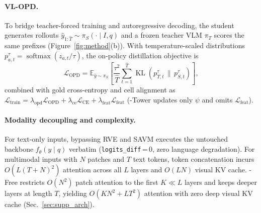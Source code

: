\paragraph{VL-OPD.}
To bridge teacher-forced training and autoregressive decoding, the student
generates rollouts $\hat{y}_{1:\hat{T}}\sim\pi_S(\cdot\mid I,q)$ and a frozen
teacher VLM $\pi_T$ scores the same prefixes (Figure~\ref{fig:method}(b)).
With temperature-scaled distributions $p_{a,t}^\tau=\operatorname{softmax}(z_{a,t}/\tau)$,
the on-policy distillation objective is
\begin{equation}
\mathcal{L}_{\mathrm{OPD}}=\mathbb{E}_{\hat{y}\sim\pi_S}\!\left[
\frac{\tau^2}{\hat{T}}\sum_{t=1}^{\hat{T}}
\operatorname{KL}\!\left(p_{T,t}^\tau\,\|\,p_{S,t}^\tau\right)\right],
\label{eq:opd}
\end{equation}
combined with gold cross-entropy and cell alignment as
$\mathcal{L}_{\mathrm{train}}=\lambda_{\mathrm{opd}}\mathcal{L}_{\mathrm{OPD}}+\lambda_{\mathrm{ce}}\mathcal{L}_{\mathrm{CE}}+\lambda_{\mathrm{feat}}\mathcal{L}_{\mathrm{feat}}$
(\modelname-Tower updates only $\psi$ and omits $\mathcal{L}_{\mathrm{feat}}$).

\paragraph{Modality decoupling and complexity.}
For text-only inputs, bypassing RVE and SAVM executes the untouched backbone
$f_\theta(y\mid q)$ verbatim (\texttt{logits\_diff}\,{=}\,$0$, zero language
degradation). For multimodal inputs with $N$ patches and $T$ text tokens,
token concatenation incurs $O(L(T{+}N)^2)$ attention across all $L$ layers and
$O(LN)$ visual KV cache. \modelname-Free restricts $O(N^2)$ patch attention to
the first $K{\ll}L$ layers and keeps deeper layers at length $T$, yielding
$O(KN^2{+}LT^2)$ attention with zero deep visual KV cache (Sec.~\ref{sec:supp_arch}).
